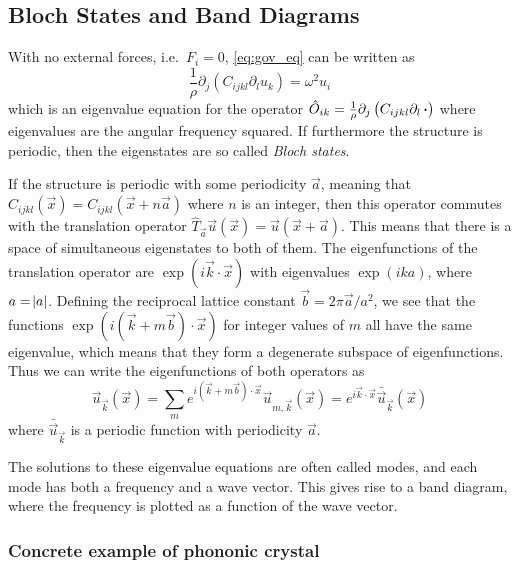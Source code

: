 \subsection{Bloch States and Band Diagrams}

With no external forces, i.e.\ $F_i = 0$, \cref{eq:gov_eq} can be written as
\begin{equation}
	\frac 1 \rho \partial_j \left(C_{ijkl} \partial_l u_k\right) = \omega^2 u_i
\end{equation}
which is an eigenvalue equation for the operator
$\hat O_{ik} = \frac 1 \rho\partial_j \left(C_{ijkl} \partial_l \operatorname{\boldsymbol{\cdot}}\right)$
where eigenvalues are the angular frequency squared.
If furthermore the structure is periodic, then the eigenstates are so called
\emph{Bloch states}.

If the structure is periodic with some periodicity $\vec a$,
meaning that $C_{ijkl}(\vec x) = C_{ijkl}(\vec x + n \vec a)$ where $n$ is an
integer, then this operator commutes with the translation operator
$\hat T_{\vec a} \vec u(\vec x) = \vec u(\vec x + \vec a)$.
This means that there is a space of simultaneous eigenstates to both of them.
The eigenfunctions of the translation operator are $\exp(i \vec k \cdot \vec
x)$ with eigenvalues $\exp(i k a)$, where $a = \abs{a}$.
Defining the reciprocal lattice constant $\vec b = 2 \pi \vec a / a^2$, we see
that the functions $\exp(i (\vec k + m \vec b) \cdot \vec x)$ for integer values
of $m$ all have the same eigenvalue, which means that they form a degenerate
subspace of eigenfunctions.
Thus we can write the eigenfunctions of both operators as
\begin{equation}
	\vec u_{\vec k}(\vec x) = \sum_m e^{i (\vec k + m \vec b) \cdot \vec x}
	\vec u_{m, \vec k}(\vec x)
	= e^{i \vec k \cdot \vec x} \bar{\vec u}_{\vec k}(\vec x)
\end{equation}
where $\bar{\vec{u}}_{\vec{k}}$ is a periodic function with periodicity $\vec a$.

The solutions to these eigenvalue equations are often called modes, and each
mode has both a frequency and a wave vector. This gives rise to a band diagram,
where the frequency is plotted as a function of the wave vector.

\subsubsection{Concrete example of phononic crystal}

